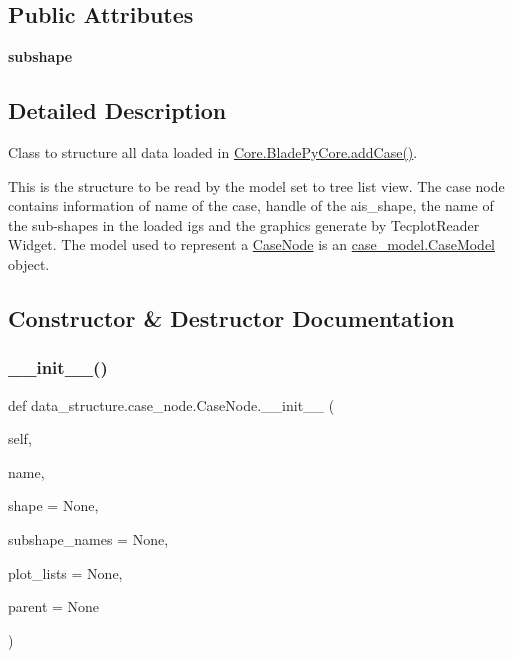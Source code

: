 \subsection*{Public Attributes}
\begin{DoxyCompactItemize}
\item 
\hypertarget{a00087_ac2f5b0ae9715edeac8f9b1ccc0fd64e3}{}\label{a00087_ac2f5b0ae9715edeac8f9b1ccc0fd64e3} 
{\bfseries subshape}
\end{DoxyCompactItemize}


\subsection{Detailed Description}
Class to structure all data loaded in \hyperlink{a00079_a1a62f9b5b8f5929bdb6f0a8c27049d9e}{Core.\+Blade\+Py\+Core.\+add\+Case()}. 

This is the structure to be read by the model set to tree list view. The case node contains information of name of the case, handle of the ais\+\_\+shape, the name of the sub-\/shapes in the loaded igs and the graphics generate by Tecplot\+Reader Widget. The model used to represent a \hyperlink{a00087}{Case\+Node} is an \hyperlink{a00083}{case\+\_\+model.\+Case\+Model} object. 

\subsection{Constructor \& Destructor Documentation}
\hypertarget{a00087_a268359dc0ff12ae9d60b0311f4d20a12}{}\label{a00087_a268359dc0ff12ae9d60b0311f4d20a12} 
\subsubsection{\texorpdfstring{\+\_\+\+\_\+init\+\_\+\+\_\+()}{\_\_init\_\_()}}
{\footnotesize\ttfamily def data\+\_\+structure.\+case\+\_\+node.\+Case\+Node.\+\_\+\+\_\+init\+\_\+\+\_\+ (\begin{DoxyParamCaption}\item[{}]{self,  }\item[{}]{name,  }\item[{}]{shape = {\ttfamily None},  }\item[{}]{subshape\+\_\+names = {\ttfamily None},  }\item[{}]{plot\+\_\+lists = {\ttfamily None},  }\item[{}]{parent = {\ttfamily None} }\end{DoxyParamCaption})}



